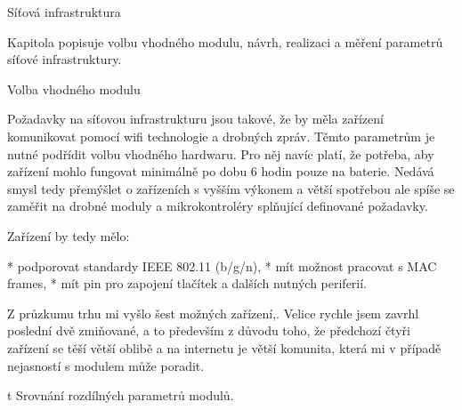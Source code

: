 
\def\ctustyle{{\ssr CTUstyle}}
\def\ttb{\tt\char`\\} %

\chap Síťová infrastruktura

Kapitola popisuje volbu vhodného modulu, návrh, realizaci a měření parametrů síťové infrastruktury.

\sec Volba vhodného modulu

Požadavky na síťovou infrastrukturu jsou takové, že by měla zařízení komunikovat pomocí wifi technologie a drobných zpráv. Těmto parametrům je nutné podřídit volbu vhodného hardwaru. Pro něj navíc platí, že potřeba, aby zařízení mohlo fungovat minimálně po dobu 6 hodin pouze na baterie. Nedává smysl tedy přemýšlet o zařízeních s vyšším výkonem a větší spotřebou ale spíše se zaměřit na drobné moduly a mikrokontroléry splňující definované požadavky.

Zařízení by tedy mělo:

\begitems
* podporovat standardy IEEE 802.11 (b/g/n),
* mít možnost pracovat s MAC frames,
* mít pin pro zapojení tlačítek a dalších nutných periferií.

\enditems

Z průzkumu trhu mi vyšlo šest možných zařízení,. Velice rychle jsem zavrhl poslední dvě zmiňované, a to především z důvodu toho, že předchozí čtyři zařízení se těší větší oblibě a na internetu je větší komunita, která mi v případě nejasností s modulem může poradit.

\midinsert {}
\caption/t Srovnání rozdílných parametrů modulů.
\endinsert

